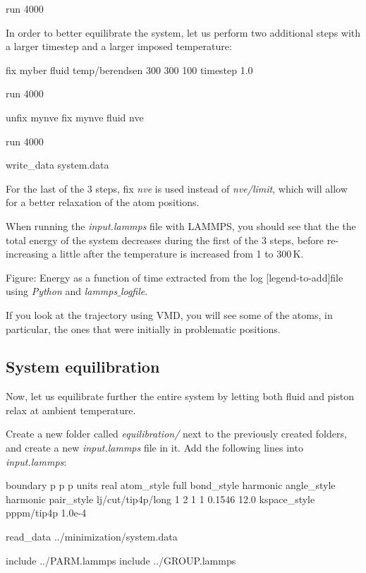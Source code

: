 \begin{lcverbatim}
run 4000
\end{lcverbatim}

\noindent In order to better equilibrate the system, let us perform 
two additional steps with a larger timestep and a larger
imposed temperature:

\begin{lcverbatim}
fix myber fluid temp/berendsen 300 300 100
timestep 1.0

run 4000

unfix mynve
fix mynve fluid nve

run 4000

write_data system.data
\end{lcverbatim}

\noindent For the last of the 3 steps, fix \textit{nve} is used instead of 
\textit{nve/limit}, which will allow for a better relaxation of the 
atom positions.

\vspace{0.25cm} \noindent When running the \textit{input.lammps} file with LAMMPS, you should see that the
the total energy of the system decreases during the first 
of the 3 steps, before re-increasing a little after the 
temperature is increased from 1 to $300\,\text{K}$.

\vspace{0.25cm} Figure: Energy as a function of time extracted from the log
[legend-to-add]file using \textit{Python} and \textit{lammps$\_$logfile}.

\vspace{0.25cm} \noindent If you look at the trajectory using VMD, you will see some
of the atoms, in particular, the ones that were
initially in problematic positions. 

\subsection{System equilibration}
\noindent Now, let us equilibrate further the entire system by letting both
fluid and piston relax at ambient temperature.

\vspace{0.25cm} \noindent Create a new folder called \textit{equilibration/} next to 
the previously created folders, and create a new
\textit{input.lammps} file in it. Add the following lines into \textit{input.lammps}:

\begin{lcverbatim}
boundary p p p
units real
atom_style full
bond_style harmonic
angle_style harmonic
pair_style lj/cut/tip4p/long 1 2 1 1 0.1546 12.0
kspace_style pppm/tip4p 1.0e-4

read_data ../minimization/system.data

include ../PARM.lammps
include ../GROUP.lammps
\end{lcverbatim}


